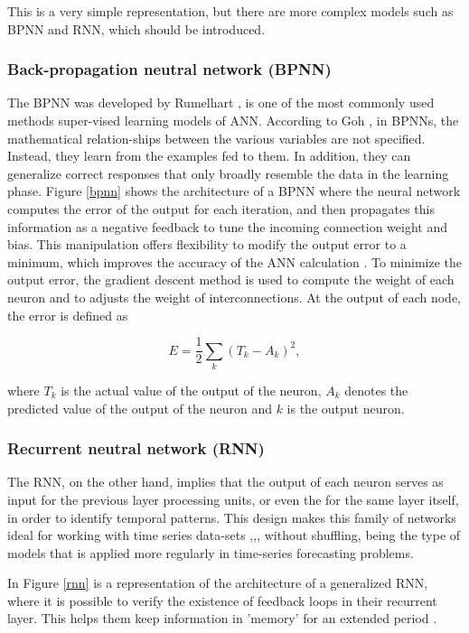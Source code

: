 This is a very simple representation, but there are more complex models such as \ac{BPNN} and \ac{RNN}, which should be introduced.

\subsubsection{Back-propagation neutral network (BPNN)}
The \ac{BPNN} was developed by Rumelhart \cite{bpnn0}, is one of the most commonly used methods super-vised learning models of ANN. According to Goh \cite{bpnn}, in \ac{BPNN}s, the mathematical relation-ships between the various variables are not specified. Instead, they learn from the examples fed to them. In addition, they can generalize correct responses that only broadly resemble the data in the learning phase. Figure \ref{bpnn} shows the architecture of a \ac{BPNN} where the neural network computes the error of the output for each iteration, and then propagates this information as a negative feedback to tune the incoming connection weight and bias. This manipulation offers flexibility to modify the output error to a minimum, which  improves the accuracy of the \ac{ANN} calculation \cite{review2017}. To minimize the output error, the gradient descent method is used to compute the weight of each neuron and to adjusts the weight of interconnections. At the output of each node, the error is defined as

\begin{equation}
   E = \frac{1}{2}\sum_k(T_k-A_k)^2,
   \label{EBPNN}
\end{equation}

where $T_k$ is the actual value of the output of the neuron, $A_k$ denotes the predicted value of the output of the neuron and $k$ is the output neuron. 

\subsubsection{Recurrent neutral network (RNN)}

The \ac{RNN}, on the other hand, implies that the output of each neuron serves as input for the previous layer processing units, or even the for the same layer itself, in order to identify temporal patterns. This design makes this family of networks ideal for working with time series data-sets \cite{rnn1},\cite{rnn2},\cite{rnn3}, without shuffling, being the type of models that is applied more regularly in time-series forecasting problems.

In Figure \ref{rnn} is a representation of the architecture of a generalized \ac{RNN}, where it is possible to verify the existence of feedback loops in their recurrent layer. This helps them keep information in 'memory' for an extended period \cite{rnn4}.


